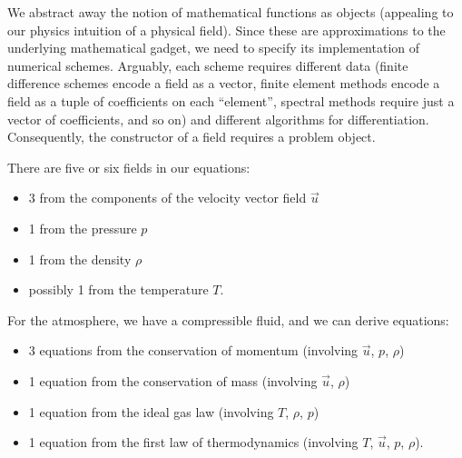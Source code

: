 We abstract away the notion of mathematical functions as 
objects (appealing to our physics intuition of a physical field). Since
these are approximations to the underlying mathematical gadget, we need
to specify its implementation of numerical schemes. Arguably, each
scheme requires different data (finite difference schemes encode a field
as a vector, finite element methods encode a field as a tuple of
coefficients on each ``element'', spectral methods require just a vector
of coefficients, and so on) and different algorithms for differentiation.
Consequently, the constructor of a field requires a problem object.

There are five or six fields in our equations:
\begin{itemize}
\item 3 from the components of the velocity vector field $\vec{u}$
\item 1 from the pressure $p$
\item 1 from the density $\rho$
\item possibly 1 from the temperature $T$.
\end{itemize}
For the atmosphere, we have a compressible fluid, and we can derive
equations:
\begin{itemize}
\item 3 equations from the conservation of momentum (involving
  $\vec{u}$, $p$, $\rho$)
\item 1 equation from the conservation of mass (involving $\vec{u}$, $\rho$)
\item 1 equation from the ideal gas law (involving $T$, $\rho$, $p$)
\item 1 equation from the first law of thermodynamics (involving $T$,
  $\vec{u}$, $p$, $\rho$).
\end{itemize}

%
